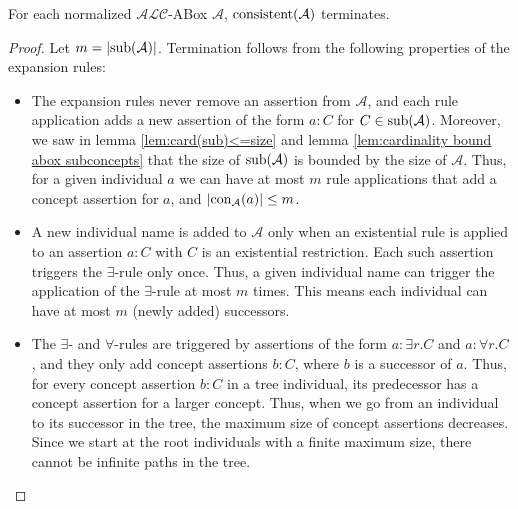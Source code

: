 \begin{lemma}[Termination]\label{lem:abox termination}
	For each normalized $\mathcal{ALC}$-ABox $\mathcal{A}$, $\operatorname{\text{consistent}}(\mathcal{A})$ terminates.
\end{lemma}
\begin{proof}
	Let $m = \lvert \operatorname{\text{sub}}(\mathcal{A}) \rvert$.
	Termination follows from the following properties of the expansion rules:
	\begin{itemize}
		\item The expansion rules never remove an assertion from $\mathcal{A}$,
			and each rule application adds a new assertion of the form $a:C$ for $C \in \operatorname{\text{sub}}(\mathcal{A})$.
			Moreover, we saw in lemma \ref{lem:card(sub)<=size} and lemma \ref{lem:cardinality bound abox subconcepts} that the size of $\operatorname{\text{sub}}(\mathcal{A})$ is bounded by the size of $\mathcal{A}$.
			Thus, for a given individual $a$ we can have at most $m$ rule applications that add a concept assertion for $a$,
			and $\lvert \operatorname{\text{con}}_{\mathcal{A}}(a) \rvert \leq m$.
		\item A new individual name is added to $\mathcal{A}$ only when an existential rule is applied to an assertion $a:C$ with $C$ is an existential restriction.
			Each such assertion triggers the $\exists$-rule only once.
			Thus, a given individual name can trigger the application of the $\exists$-rule at most $m$ times.
			This means each individual can have at most $m$ (newly added) successors.
		\item The $\exists$- and $\forall$-rules are triggered by assertions of the form $a : \exists r.C$ and $a : \forall r.C$, and they only add concept assertions $b:C$, where $b$ is a successor of $a$.
			Thus, for every concept assertion $b:C$ in a tree individual, its predecessor has a concept assertion for a larger concept.
			Thus, when we go from an individual to its successor in the tree, the maximum size of concept assertions decreases.
			Since we start at the root individuals with a finite maximum size, there cannot be infinite paths in the tree. \qedhere
	\end{itemize}
\end{proof}

